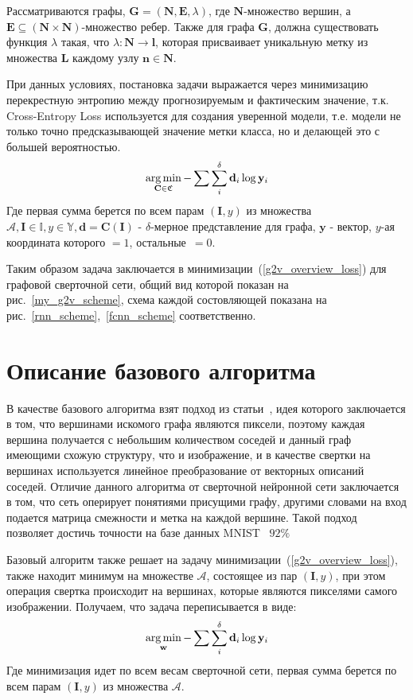 \documentclass[12pt, twoside]{article}
\begin{document}
Рассматриваются графы, $\mathbf{G} = (\mathbf{N}, \mathbf{E}, \lambda)$, где $\mathbf{N}$-множество вершин, а $\mathbf{E} \subseteq (\mathbf{N}\times \mathbf{N})$-множество ребер. Также для графа $\mathbf{G}$, должна существовать функция $\lambda$ такая, что $\lambda\colon \mathbf{N} \to \mathbf{l}$, которая присваивает уникальную метку из множества $\mathbf{L}$ каждому узлу $\mathbf{n} \in \mathbf{N}$.

При данных условиях, постановка задачи выражается через минимизацию перекрестную энтропию между прогнозируемым и фактическим значение, т.к. Cross-Entropy Loss используется для создания уверенной модели, т.е. модели не только точно предсказывающей значение метки класса, но и делающей это с большей вероятностью.
\begin{equation}
\label{g2v_overview_loss}
    \argmin_{\mathbf{C} \in \mathfrak{C}} -\sum \sum_i^\delta \mathbf{d}_i\log \mathbf{y}_i
\end{equation}
Где первая сумма берется по всем парам $(\mathbf{I}, y)$ из множества $\mathcal{A}, \mathbf{I} \in \mathbb{I}, y \in \mathbb{Y}, \mathbf{d} = \mathbf{C}(\mathbf{I})$ - $\delta$-мерное представление для графа, $\mathbf{y}$ - вектор, $y$-ая координата которого $= 1$, остальные~$=0$.

Таким образом задача заключается в минимизации~(\ref{g2v_overview_loss}) для графовой сверточной сети, общий вид которой показан на рис.~\ref{my_g2v_scheme}, схема каждой состовляющей показана на рис.~\ref{rnn_scheme},~\ref{fcnn_scheme} соответственно. 

\section{Описание базового алгоритма}
В качестве базового алгоритма взят подход из статьи~\cite{base_alg}, идея которого заключается в том, что вершинами искомого графа являются пиксели, поэтому каждая вершина получается с небольшим количеством соседей и данный граф имеющими схожую структуру, что и изображение, и в качестве свертки на вершинах используется линейное преобразование от векторных описаний соседей. Отличие данного алгоритма от сверточной нейронной сети заключается в том, что сеть оперирует понятиями присущими графу, другими словами на вход подается матрица смежности и метка на каждой вершине. Такой подход позволяет достичь точности на базе данных MNIST~\cite{mnist_explanation} $92\%$


Базовый алгоритм также решает на задачу минимизации~(\ref{g2v_overview_loss}), также находит минимум на множестве $\mathcal{A}$, состоящее из пар $(\mathbf{I}, y)$, при этом операция свертка происходит на вершинах, которые являются пикселями самого изображении. Получаем, что задача переписывается в виде:
\begin{equation}
\label{cnn_overview_loss}
    \argmin_{\mathbf{w}} -\sum \sum_i^\delta \mathbf{d}_i\log \mathbf{y}_i
\end{equation}
Где минимизация идет по всем весам сверточной сети, первая сумма берется по всем парам $(\mathbf{I}, y)$ из множества $\mathcal{A}$.
\end{document}
